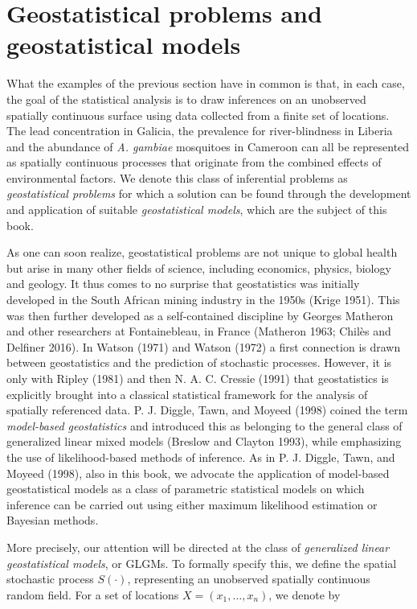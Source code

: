 \documentclass[
  letterpaper,
]{krantz}
\begin{document}
\section{Geostatistical problems and geostatistical
models}\label{sec-geostat-models}

What the examples of the previous section have in common is that, in
each case, the goal of the statistical analysis is to draw inferences on
an unobserved spatially continuous surface using data collected from a
finite set of locations. The lead concentration in Galicia, the
prevalence for river-blindness in Liberia and the abundance of \emph{A.
gambiae} mosquitoes in Cameroon can all be represented as spatially
continuous processes that originate from the combined effects of
environmental factors. We denote this class of inferential problems as
\emph{geostatistical problems} for which a solution can be found through
the development and application of suitable \emph{geostatistical
models}, which are the subject of this book.

As one can soon realize, geostatistical problems are not unique to
global health but arise in many other fields of science, including
economics, physics, biology and geology. It thus comes to no surprise
that geostatistics was initially developed in the South African mining
industry in the 1950s (Krige 1951). This was then further developed as a
self-contained discipline by Georges Matheron and other researchers at
Fontainebleau, in France (Matheron 1963; Chilès and Delfiner 2016). In
Watson (1971) and Watson (1972) a first connection is drawn between
geostatistics and the prediction of stochastic processes. However, it is
only with Ripley (1981) and then N. A. C. Cressie (1991) that
geostatistics is explicitly brought into a classical statistical
framework for the analysis of spatially referenced data. P. J. Diggle,
Tawn, and Moyeed (1998) coined the term \emph{model-based geostatistics}
and introduced this as belonging to the general class of generalized
linear mixed models (Breslow and Clayton 1993), while emphasizing the
use of likelihood-based methods of inference. As in P. J. Diggle, Tawn,
and Moyeed (1998), also in this book, we advocate the application of
model-based geostatistical models as a class of parametric statistical
models on which inference can be carried out using either maximum
likelihood estimation or Bayesian methods.

More precisely, our attention will be directed at the class of
\emph{generalized linear geostatistical models}, or GLGMs. To formally
specify this, we define the spatial stochastic process \(S(\cdot)\),
representing an unobserved spatially continuous random field. For a set
of locations \(X = (x_1, \ldots, x_n)\), we denote by
\end{document}
